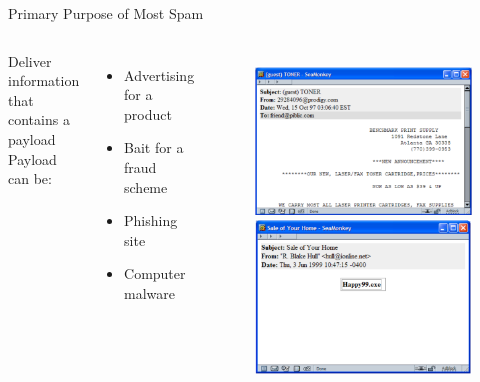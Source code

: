 \documentclass[nobackground,dvipsnames,table]{beamer}
\begin{document}
\begin{frame}{Primary Purpose of Most Spam}
    \begin{columns}
            Deliver information that contains a payload\\
            Payload can be:\\
            \begin{itemize}
                \item Advertising for a product
                \item Bait for a fraud scheme
                \item Phishing site
                \item Computer malware
            \end{itemize}
            \begin{figure}
                \centering
                \includegraphics[width=\textwidth]{spam-payload-ad}
                \includegraphics[width=\textwidth]{spam-payload-exe}
            \end{figure}
    \end{columns}
\end{frame}
\end{document}
